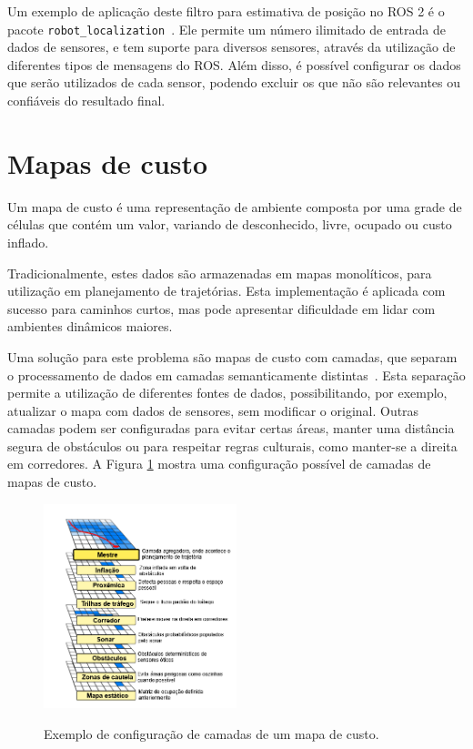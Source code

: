 \documentclass[repeatfields,xlists,xpacks,oneside,yearsonly]{ufrgscca}
\begin{document}
Um exemplo de aplicação deste filtro para estimativa de posição no
ROS 2 é o pacote
\texttt{robot\_localization}~\cite{robot_localization_paper}. Ele
permite um número ilimitado de entrada de dados de sensores, e tem
suporte para diversos sensores, através da utilização de diferentes
tipos de mensagens do ROS. Além disso, é possível configurar os dados
que serão utilizados de cada sensor, podendo excluir os que não são
relevantes ou confiáveis do resultado final.

\section{Mapas de custo}

Um mapa de custo é uma representação de ambiente composta por uma
grade de células que contém um valor, variando de desconhecido,
livre, ocupado ou custo inflado.

Tradicionalmente, estes dados são armazenadas em mapas monolíticos,
para utilização em planejamento de trajetórias. Esta implementação é
aplicada com sucesso para caminhos curtos, mas pode apresentar
dificuldade em lidar com ambientes dinâmicos
maiores.

Uma solução para este problema são mapas de custo com camadas, que
separam o processamento de dados em camadas semanticamente
distintas~\cite{layered_costmaps}. Esta separação permite a
utilização de diferentes fontes de dados, possibilitando, por
exemplo, atualizar o mapa com dados de sensores, sem modificar o
original. Outras camadas podem ser configuradas para evitar certas
áreas, manter uma distância segura de obstáculos ou para respeitar
regras culturais, como manter-se a direita em corredores. A Figura
\ref{fig:mapa_camadas} mostra uma configuração possível de camadas de
mapas de custo.

\begin{figure}[h]
    {
        \centering
        \caption{Exemplo de configuração de camadas de um mapa de custo.}
        \label{fig:mapa_camadas}
        \includegraphics[width=0.5\textwidth]{mapa_camadas_trad.png}\\
    }
    {}
\end{figure}
\end{document}
